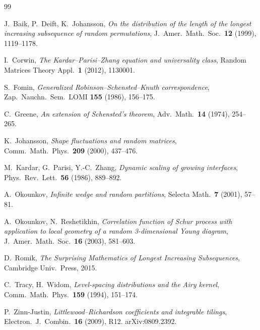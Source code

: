 \documentclass[11pt]{article}
\theoremstyle{plain}
\theoremstyle{definition}
\theoremstyle{remark}
\begin{document}
\begin{thebibliography}{99}

J.~Baik, P.~Deift, K.~Johansson,
\emph{On the distribution of the length of the longest increasing
  subsequence of random permutations},
J.~Amer.\ Math.\ Soc.\ \textbf{12} (1999), 1119--1178.

I.~Corwin,
\emph{The Kardar--Parisi--Zhang equation and universality class},
Random Matrices Theory Appl.\ \textbf{1} (2012), 1130001.

S.~Fomin,
\emph{Generalized Robinson--Schensted--Knuth correspondence},
Zap.\ Nauchn.\ Sem.\ LOMI \textbf{155} (1986), 156--175.

C.~Greene,
\emph{An extension of Schensted's theorem},
Adv.\ Math.\ \textbf{14} (1974), 254--265.

K.~Johansson,
\emph{Shape fluctuations and random matrices},
Comm.\ Math.\ Phys.\ \textbf{209} (2000), 437--476.

M.~Kardar, G.~Parisi, Y.-C.~Zhang,
\emph{Dynamic scaling of growing interfaces},
Phys.\ Rev.\ Lett.\ \textbf{56} (1986), 889--892.

A.~Okounkov,
\emph{Infinite wedge and random partitions},
Selecta Math.\ \textbf{7} (2001), 57--81.

A.~Okounkov, N.~Reshetikhin,
\emph{Correlation function of Schur process with application to local
  geometry of a random 3-dimensional Young diagram},
J.~Amer.\ Math.\ Soc.\ \textbf{16} (2003), 581--603.

D.~Romik,
\emph{The Surprising Mathematics of Longest Increasing Subsequences},
Cambridge Univ.\ Press, 2015.

C.~Tracy, H.~Widom,
\emph{Level-spacing distributions and the Airy kernel},
Comm.\ Math.\ Phys.\ \textbf{159} (1994), 151--174.

P.~Zinn-Justin,
\emph{Littlewood--Richardson coefficients and integrable tilings},
Electron.\ J.\ Combin.\ \textbf{16} (2009), R12.
arXiv:0809.2392.

\end{thebibliography}
\end{document}
